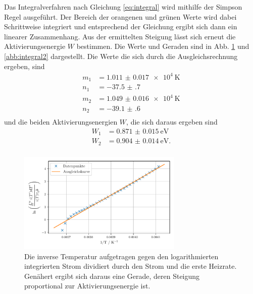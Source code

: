 Das Integralverfahren nach Gleichung \eqref{eq:integral} wird mithilfe der Simpson Regel ausgeführt. Der Bereich der orangenen und grünen Werte wird dabei Schrittweise integriert und entsprechend der Gleichung ergibt sich dann ein linearer Zusammenhang.
Aus der ermittelten Steigung lässt sich erneut die Aktivierungsenergie $W$ bestimmen. Die Werte und Geraden sind in Abb. \ref{abb:integral1} und \ref{abb:integral2} dargestellt. Die Werte die sich durch die Ausgleichsrechnung ergeben, sind 
\begin{align*}
    m_{1} &= \SI{1.011(17)e4}{\kelvin} \\
    n_{1} &= \num{-37.5(7)} \\
    m_{2} &= \SI{1.049(16)e4}{\kelvin} \\
    n_{2} &= \num{-39.1(6)} \\
\end{align*}
und die beiden Aktivierungsenergien $W$, die sich daraus ergeben sind 
\begin{align*}
    W_{1} &= \SI{0.871(15)}{\electronvolt} \\
    W_{2} &= \SI{0.904(14)}{\electronvolt}. \\
\end{align*}

\begin{figure}
    \centering
    \includegraphics[width=0.7\textwidth]{figures/integral1.pdf}
    \caption{Die inverse Temperatur aufgetragen gegen den logarithmierten integrierten Strom dividiert durch den Strom und die erste Heizrate. Genähert ergibt sich daraus eine Gerade, deren Steigung proportional zur Aktivierungsenergie ist.}
    \label{abb:integral1}
\end{figure}

